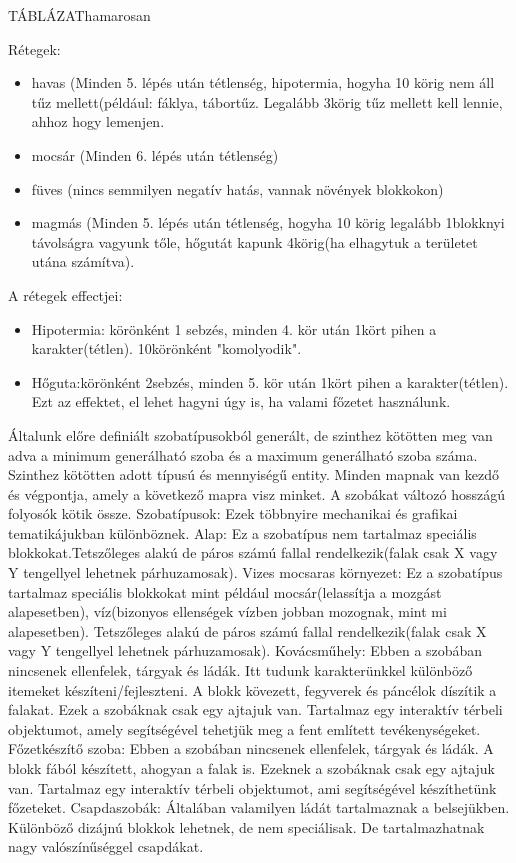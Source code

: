 
TÁBLÁZAT{hamarosan}


Rétegek:
\begin{itemize}
    \item havas (Minden 5. lépés után tétlenség, hipotermia, hogyha 10 körig nem áll tűz mellett(például: fáklya, tábortűz. Legalább 3körig tűz mellett kell lennie, ahhoz hogy lemenjen. 
    \item mocsár (Minden 6. lépés után tétlenség)
    \item füves (nincs semmilyen negatív hatás, vannak növények blokkokon)
    \item magmás (Minden 5. lépés után tétlenség, hogyha 10 körig legalább 1blokknyi távolságra vagyunk tőle, hőgutát kapunk 4körig(ha elhagytuk a területet utána számítva). 
\end{itemize}
A rétegek effectjei:
\begin{itemize}
  \item Hipotermia: körönként 1 sebzés, minden 4. kör után 1kört pihen a karakter(tétlen). 10körönként "komolyodik".
  \item Hőguta:körönként 2sebzés, minden 5. kör után 1kört pihen a karakter(tétlen). Ezt az effektet, el lehet hagyni úgy is, ha valami főzetet használunk.
\end{itemize}

Általunk előre definiált szobatípusokból generált, de szinthez kötötten meg van adva a minimum generálható szoba és a maximum generálható szoba száma.
Szinthez kötötten adott típusú és mennyiségű entity.
Minden mapnak van kezdő és végpontja, amely a következő mapra visz minket.
A szobákat változó hosszágú folyosók kötik össze.
Szobatípusok:
Ezek többnyire mechanikai és grafikai tematikájukban különböznek.
Alap:
Ez a szobatípus nem tartalmaz speciális blokkokat.Tetszőleges alakú de páros számú fallal rendelkezik(falak csak X vagy Y tengellyel lehetnek párhuzamosak).
Vizes mocsaras környezet:
Ez a szobatípus tartalmaz speciális blokkokat mint például mocsár(lelassítja a mozgást alapesetben), víz(bizonyos ellenségek vízben jobban mozognak, mint mi alapesetben).
Tetszőleges alakú de páros számú fallal rendelkezik(falak csak X vagy Y tengellyel lehetnek párhuzamosak).
Kovácsműhely:
Ebben a szobában nincsenek ellenfelek, tárgyak és ládák. Itt tudunk karakterünkkel különböző itemeket készíteni/fejleszteni. A blokk kövezett, fegyverek és páncélok díszítik a falakat. Ezek a szobáknak csak egy ajtajuk van. Tartalmaz egy interaktív térbeli objektumot, amely segítségével tehetjük meg a fent említett tevékenységeket.
Főzetkészítő szoba:
Ebben a szobában nincsenek ellenfelek, tárgyak és ládák. A blokk fából készített, ahogyan a falak is. Ezeknek a szobáknak csak egy ajtajuk van. Tartalmaz egy interaktív térbeli objektumot, ami segítségével készíthetünk főzeteket.
Csapdaszobák:
Általában valamilyen ládát tartalmaznak a belsejükben.
Különböző dizájnú blokkok lehetnek, de nem speciálisak. De tartalmazhatnak nagy valószínűséggel csapdákat.

